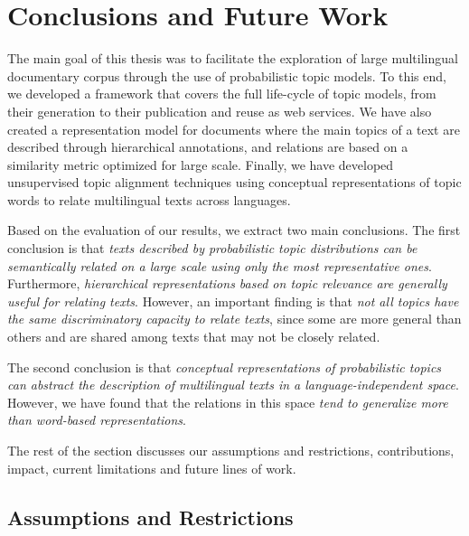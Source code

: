 

\chapter{Conclusions and Future Work}\label{ch:conclusion}

\graphicspath{{conclusions/figures/}}

The main goal of this thesis was to facilitate the exploration of large multilingual documentary corpus through the use of probabilistic topic models. To this end, we developed a framework that covers the full life-cycle of topic models, from their generation to their publication and reuse as web services. We have also created a representation model for documents where the main topics of a text are described through hierarchical annotations, and relations are based on a similarity metric optimized for large scale. Finally, we have developed unsupervised topic alignment techniques using conceptual representations of topic words to relate multilingual texts across languages. 

Based on the evaluation of our results, we extract two main conclusions. The first conclusion is that \textit{texts described by probabilistic topic distributions can be semantically related on a large scale using only the most representative ones}. Furthermore, \textit{hierarchical representations based on topic relevance are generally useful for relating texts}. However, an important finding is that \textit{not all topics have the same discriminatory capacity to relate texts}, since some are more general than others and are shared among texts that may not be closely related.

The second conclusion is that \textit{conceptual representations of probabilistic topics can abstract the description of multilingual texts in a language-independent space}. However, we have found that the relations in this space \textit{tend to generalize more than word-based representations}. 

The rest of the section discusses our assumptions and restrictions, contributions, impact, current limitations and future lines of work. 

\section{Assumptions and Restrictions}


